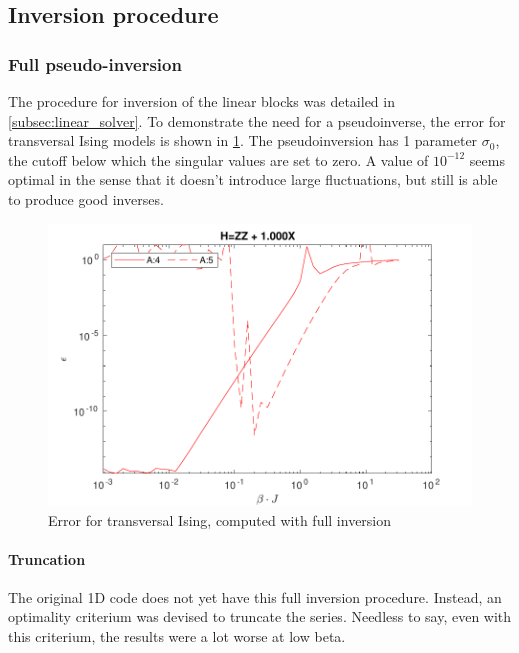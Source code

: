 \subsection{Inversion procedure}\label{subsec:inversion_procedure}

\subsubsection{Full pseudo-inversion}

The procedure for inversion of the linear blocks was detailed in \cref{subsec:linear_solver}. To demonstrate the need for a pseudoinverse, the error for transversal Ising models is shown in \cref{benc:fig:fullinv}. The pseudoinversion has 1 parameter $\sigma_0$, the cutoff below which the singular values are set to zero. A value of $10^{-12}$ seems optimal in the sense that it doesn't introduce large fluctuations, but still is able to produce good inverses.

\begin{figure}
    \center
    \includegraphics[width=\textwidth]{Figuren/benchmarking/t_ising_full_inverse.pdf }
    \caption{Error for transversal Ising, computed with full inversion }
    \label{benc:fig:fullinv}
\end{figure}

\paragraph{Truncation}

The original 1D code does not yet have this full inversion procedure. Instead, an optimality criterium was devised to truncate the series. Needless to say, even with this criterium, the results were a lot worse at low beta.

